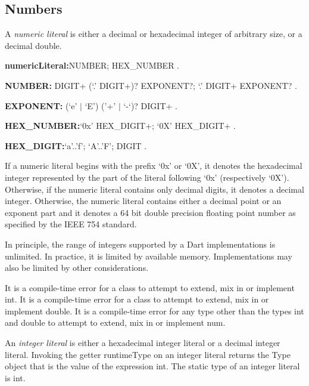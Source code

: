 \documentclass{article}
\newcommand{\code}[1]{{\sf #1}}
\begin{document}
\subsection{Numbers}

\LMHash{}
A {\em numeric literal} is either a decimal or hexadecimal integer of arbitrary size, or a decimal double.

\begin{grammar}
{\bf numericLiteral:}NUMBER;
      HEX\_NUMBER
    .

  {\bf NUMBER:} DIGIT+ (`{\escapegrammar.}' DIGIT+)? EXPONENT?;
      {`\escapegrammar .}' DIGIT+ EXPONENT?
    .

{\bf  EXPONENT:}
      (`e' $|$ `E') ('+' $|$ `-`)? DIGIT+
    .

{\bf HEX\_NUMBER:}`0x' HEX\_DIGIT+;
      `0X' HEX\_DIGIT+
    .

 {\bf HEX\_DIGIT:}`a'{\escapegrammar ..}'f';
      `A'{\escapegrammar ..}'F';
      DIGIT
    .
 \end{grammar}

\LMHash{}
If a numeric literal begins with the prefix `0x' or `0X', it denotes the hexadecimal integer represented by the part of the literal following `0x' (respectively `0X'). Otherwise, if the numeric literal contains only decimal digits, it denotes a decimal integer.  Otherwise, the numeric literal contains either a decimal point or an exponent part and it denotes a 64 bit double precision floating point number as specified by the IEEE 754 standard.

\LMHash{}
In principle, the range of integers supported by a Dart implementations is unlimited. In practice, it is limited by available memory. Implementations may also be limited by other considerations.


\LMHash{}
It is a compile-time error for a class to attempt to extend, mix in or implement \code{int}. It is a compile-time error for a class to attempt to extend, mix in or implement \code{double}. It is a compile-time error for any type other than the types \code{int} and \code{double} to attempt to extend, mix in or implement \code{num}.

\LMHash{}
An {\em integer literal} is either a hexadecimal integer literal or a  decimal integer literal. Invoking the getter \code{runtimeType} on an integer literal returns the \code{Type} object that is the value of the expression \code{int}. The static type of an integer literal is \code{int}.
\end{document}
